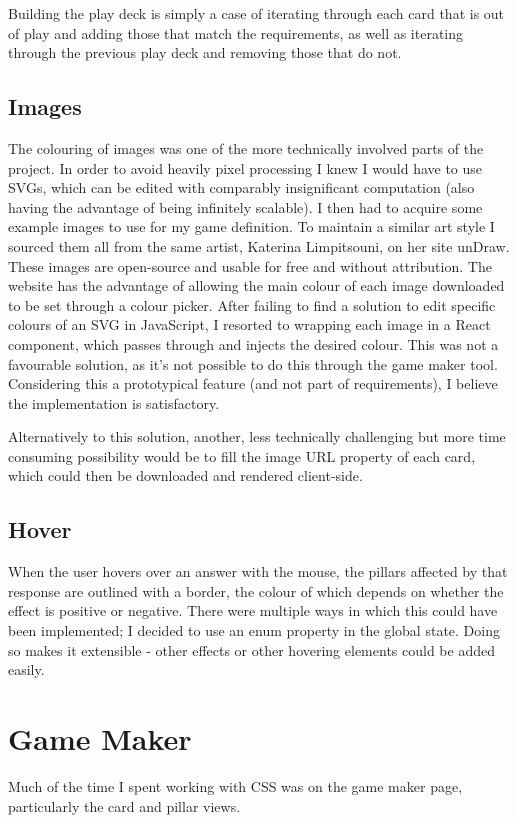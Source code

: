 Building the play deck is simply a case of iterating through each card that is out of play and adding those that match the requirements, as well as iterating through the previous play deck and removing those that do not.

\subsection{Images}
The colouring of images was one of the more technically involved parts of the project. 
In order to avoid heavily pixel processing I knew I would have to use SVGs, which can be edited with comparably insignificant computation (also having the advantage of being infinitely scalable). 
I then had to acquire some example images to use for my game definition. 
To maintain a similar art style I sourced them all from the same artist, Katerina Limpitsouni, on her site unDraw\cite{Undraw}. These images are open-source and usable for free and without attribution. 
The website has the advantage of allowing the main colour of each image downloaded to be set through a colour picker. 
After failing to find a solution to edit specific colours of an SVG in JavaScript, I resorted to wrapping each image in a React component, which passes through and injects the desired colour. 
This was not a favourable solution, as it's not possible to do this through the game maker tool. 
Considering this a prototypical feature (and not part of requirements), I believe the implementation is satisfactory.

Alternatively to this solution, another, less technically challenging but more time consuming possibility would be to fill the image URL property of each card, which could then be downloaded and rendered client-side.

\subsection{Hover}
When the user hovers over an answer with the mouse, the pillars affected by that response are outlined with a border, the colour of which depends on whether the effect is positive or negative. 
There were multiple ways in which this could have been implemented; I decided to use an enum property in the global state. 
Doing so makes it extensible - other effects or other hovering elements could be added easily.

\section{Game Maker}
Much of the time I spent working with CSS was on the game maker page, particularly the card and pillar views. 

